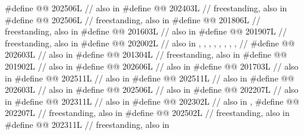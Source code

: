 \begin{codeblock}
#define @@                    202506L // also in 
#define @@                         202403L // freestanding, also in 
#define @@                     202506L // freestanding, also in 
#define @@                 201806L // freestanding, also in 
#define @@           201603L // also in 
#define @@                            201907L // freestanding, also in 
#define @@                          202002L
  // also in , , , , , , , ,
  // 
#define @@                202603L // also in 
#define @@                 201304L // freestanding, also in 
#define @@                         201902L // also in 
#define @@                          202606L // also in 
#define @@                        201703L // also in 
#define @@                          202511L // also in 
#define @@                          202511L // also in 
#define @@                            202603L // also in 
#define @@                       202506L // also in 
#define @@                     202207L // also in 
#define @@                      202311L // also in 
#define @@                        202302L // also in , 
#define @@                      202207L // freestanding, also in 
#define @@            202502L // freestanding, also in 
#define @@                202311L // freestanding, also in 

\end{codeblock}
